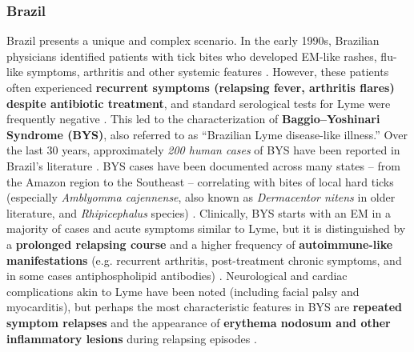 \documentclass[11pt,letterpaper]{article}
\begin{document}
\subsubsection{Brazil}
Brazil presents a unique and complex scenario. In the early 1990s, Brazilian physicians identified patients with tick bites who developed EM-like rashes, flu-like symptoms, arthritis and other systemic features \citep{Yoshinari2022g}. However, these patients often experienced \textbf{recurrent symptoms (relapsing fever, arthritis flares) despite antibiotic treatment}, and standard serological tests for Lyme were frequently negative \citep{Yoshinari2022h, Yoshinari2022i}. This led to the characterization of \textbf{Baggio–Yoshinari Syndrome (BYS)}, also referred to as “Brazilian Lyme disease-like illness.” Over the last 30 years, approximately \textit{200 human cases} of BYS have been reported in Brazil’s literature \citep{Labruna2024}. BYS cases have been documented across many states – from the Amazon region to the Southeast – correlating with bites of local hard ticks (especially \textit{Amblyomma cajennense}, also known as \textit{Dermacentor nitens} in older literature, and \textit{Rhipicephalus} species) \citep{Yoshinari2022j, Yoshinari2022k}. Clinically, BYS starts with an EM in a majority of cases and acute symptoms similar to Lyme, but it is distinguished by a \textbf{prolonged relapsing course} and a higher frequency of \textbf{autoimmune-like manifestations} (e.g. recurrent arthritis, post-treatment chronic symptoms, and in some cases antiphospholipid antibodies) \citep{Yoshinari2022l, Yoshinari2022m}. Neurological and cardiac complications akin to Lyme have been noted (including facial palsy and myocarditis), but perhaps the most characteristic features in BYS are \textbf{repeated symptom relapses} and the appearance of \textbf{erythema nodosum and other inflammatory lesions} during relapsing episodes \citep{Yoshinari2022n, Yoshinari2022o}.
\end{document}
